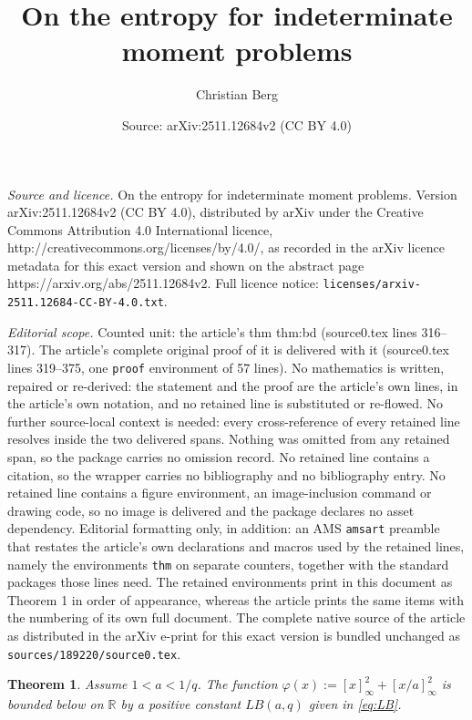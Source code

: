 \documentclass[10pt,a4paper]{amsart}
\title{On the entropy for indeterminate moment problems}
\author{Christian Berg}
\date{Source: arXiv:2511.12684v2 (CC BY 4.0)}
\newtheorem{thm}{Theorem}
\newcommand{\R}{\mathbb{R}}
\begin{document}
\maketitle

\noindent\emph{Source and licence.} On the entropy for indeterminate moment problems. Version arXiv:2511.12684v2 (CC BY 4.0), distributed by arXiv under the Creative Commons Attribution 4.0 International licence, http://creativecommons.org/licenses/by/4.0/, as recorded in the arXiv licence metadata for this exact version and shown on the abstract page https://arxiv.org/abs/2511.12684v2. Full licence notice: \texttt{licenses/arxiv-2511.12684-CC-BY-4.0.txt}.\par\smallskip

\noindent\textit{Editorial scope.} Counted unit: the article's thm thm:bd (source0.tex lines 316--317). The article's complete original proof of it is delivered with it (source0.tex lines 319--375, one \texttt{proof} environment of 57 lines). No mathematics is written, repaired or re-derived: the statement and the proof are the article's own lines, in the article's own notation, and no retained line is substituted or re-flowed.  No further source-local context is needed: every cross-reference of every retained line resolves inside the two delivered spans.  Nothing was omitted from any retained span, so the package carries no omission record.  No retained line contains a citation, so the wrapper carries no bibliography and no bibliography entry.  No retained line contains a figure environment, an image-inclusion command or drawing code, so no image is delivered and the package declares no asset dependency.  Editorial formatting only, in addition: an AMS \texttt{amsart} preamble that restates the article's own declarations and macros used by the retained lines, namely the environments \texttt{thm} on separate counters, together with the standard packages those lines need.  The retained environments print in this document as Theorem 1 in order of appearance, whereas the article prints the same items with the numbering of its own full document.  The complete native source of the article as distributed in the arXiv e-print for this exact version is bundled unchanged as \texttt{sources/189220/source0.tex}.
\begin{thm}\label{thm:bd} Assume $1<a<1/q$. The function $\varphi(x):=[x]_\infty^2+[x/a]_\infty^2$ is bounded below on $\R$ by a positive constant $LB(a,q)$  given in \eqref{eq:LB}.
\end{thm}
\end{document}
